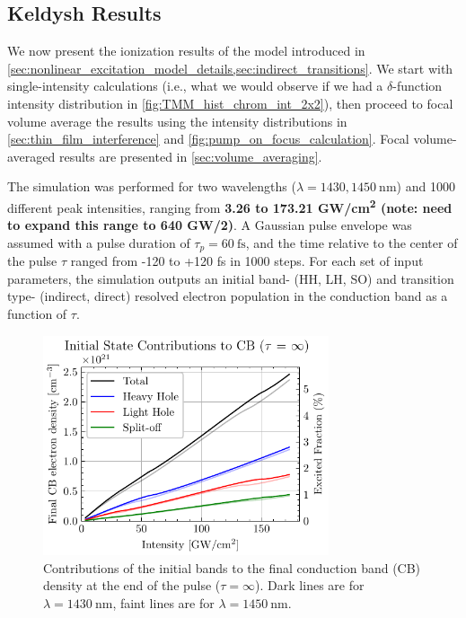 \subsection{Keldysh Results}
\label{sec:nonlinear_excitation_results}

We now present the ionization results of the model introduced in \cref{sec:nonlinear_excitation_model_details,sec:indirect_transitions}. We start with single-intensity calculations (i.e., what we would observe if we had a $\delta$-function intensity distribution in \cref{fig:TMM_hist_chrom_int_2x2}), then proceed to focal volume average the results using the intensity distributions in \cref{sec:thin_film_interference} and \cref{fig:pump_on_focus_calculation}. Focal volume-averaged results are presented in \cref{sec:volume_averaging}.

The simulation was performed for two wavelengths ($\lambda = 1430, 1450 \ \textrm{nm}$) and 1000 different peak intensities, ranging from \textbf{3.26 to 173.21 GW/cm\textsuperscript{2} (note: need to expand this range to 640 GW/2)}. A Gaussian pulse envelope was assumed with a pulse duration of $\tau_p = 60 \ \textrm{fs}$, and the time relative to the center of the pulse $\tau$ ranged from -120 to +120 fs in 1000 steps. For each set of input parameters, the simulation outputs an initial band- (HH, LH, SO) and transition type- (indirect, direct) resolved electron population in the conduction band as a function of $\tau$.

\begin{figure}
	\centering
	\includegraphics[width=0.75\textwidth]{figures/chap4/CB_dens_vs_Int.pdf}
	\caption{Contributions of the initial bands to the final conduction band (CB) density at the end of the pulse ($\tau = \infty$). Dark lines are for $\lambda = 1430 \ \textrm{nm}$, faint lines are for $\lambda = 1450 \ \textrm{nm}$.}
	\label{fig:CB_dens_vs_Int}
\end{figure}

